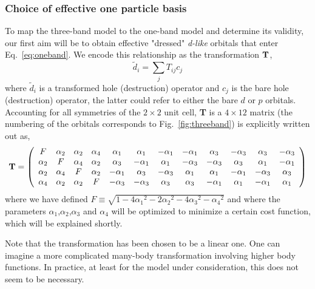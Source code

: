 \documentclass[prl,12pt,onecolumn,nofootinbib,notitlepage,english,superscriptaddress]{revtex4-1}
\begin{document}
\subsubsection{Choice of effective one particle basis}
To map the three-band model to the one-band model and determine its validity, 
our first aim will be to obtain effective "dressed" \emph{d-like} 
orbitals that enter Eq.~\ref{eq:oneband}. We encode this relationship as 
the transformation ${\bf T}$, 
\begin{equation}
	\tilde{d}_i = \sum_{j} T_{ij} c_j
\end{equation}
where $\tilde{d}_i$ is a transformed hole (destruction) operator and $c_j$ is the bare hole (destruction)
operator, the latter could refer to either the bare $d$ or $p$ orbitals. Accounting for all symmetries of 
the $2\times2$ unit cell, {\bf T} is a $4 \times 12 $ matrix (the numbering of the orbitals 
corresponds to Fig.~\ref{fig:threeband}) is explicitly written out as, 
\begin{eqnarray}
{\bf T} = 
\left(
\begin{array}{cccccccccccc}
F        & \alpha_2 &        \alpha_2 &  \alpha_4 & \alpha_1 & \alpha_1 & -\alpha_1 & -\alpha_1 & \alpha_3 & -\alpha_3 & \alpha_3 & -\alpha_3 \\
\alpha_2 &  F       &        \alpha_4 &  \alpha_2 & \alpha_3 & -\alpha_1 & \alpha_1 & -\alpha_3 & -\alpha_3 & \alpha_3 & \alpha_1 & -\alpha_1 \\
\alpha_2 & \alpha_4 & F               &  \alpha_2 & -\alpha_1 & \alpha_3 & -\alpha_3 & \alpha_1 & \alpha_1 & -\alpha_1 & -\alpha_3 & \alpha_3 \\
\alpha_4 & \alpha_2 & \alpha_2        &   F       & -\alpha_3 & -\alpha_3 & \alpha_3 & \alpha_3 & -\alpha_1 & \alpha_1 & -\alpha_1 & \alpha_1 \\
\end{array}
\right)
\end{eqnarray}
where we have defined $F \equiv \sqrt{1-4{\alpha_1}^2 - 2{\alpha_2}^2 - 4 {\alpha_3}^2 -{\alpha_4}^2}$ and 
where the parameters $\alpha_1$,$\alpha_2$,$\alpha_3$ and $\alpha_4$ will be 
optimized to minimize a certain cost function, which will be explained shortly. 

Note that the transformation has been chosen to be a linear one. One can imagine a more complicated 
many-body transformation involving higher body functions. In practice, at least for the model under 
consideration, this does not seem to be necessary. 
\end{document}
